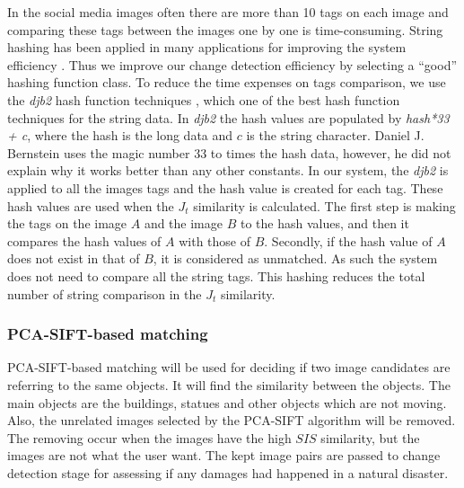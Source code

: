 \documentclass[runningheads,a4paper]{llncs}
\newcommand{\eat}[1]{}
\begin{document}
In the social media images often there are more than 10 tags on each image and comparing these tags between the images one by one is time-consuming. 
String hashing has been applied in many applications for improving the system efficiency \cite{DBLP:conf/sigmod/ZhouCZCHW15}. 
Thus we improve our change detection efficiency by selecting a ``good'' hashing function class. 
To reduce the time expenses on tags comparison, we use the \textit{djb2} hash function techniques \cite{MartínezFE14},
which one of the best hash function techniques for the string data. 
In \textit{djb2} the hash values are populated by \textit{hash*33 + c}, 
where the hash is the long data and $c$ is the string character. 
Daniel J. Bernstein uses the magic number 33 to times the hash data, however, he did not explain why it works better than any other constants.
In our system, the \textit{djb2} is applied to all the images tags and the hash value is created for each tag. These hash values are used when the $J_t$ similarity is calculated. The first step is making the tags on the image $A$ and the image $B$ to the hash values, and then it compares the hash values of $A$ with those of $B$. Secondly, if the hash value of $A$ does not exist in that of $B$, it is considered as unmatched. As such the system does not need to compare all the string tags. This hashing reduces the total number of string comparison in the $J_t$ similarity.

\eat{
Para 1: how to choose cluster algorithm, and extend it to SIS similarity

Para 2: how to index social images for quick clustering
}

\subsubsection{PCA-SIFT-based matching} 

PCA-SIFT-based matching will be used for deciding if two image candidates are referring to the same objects. 
It will find the similarity between the objects. The main objects are the buildings, statues and other objects which are not moving. Also, the unrelated images selected by the PCA-SIFT algorithm will be removed. 
The removing occur when the images have the high $SIS$ similarity, but the images are not what the user want. The kept image pairs are passed to change detection stage for assessing if any damages had happened in a natural disaster.
\end{document}
